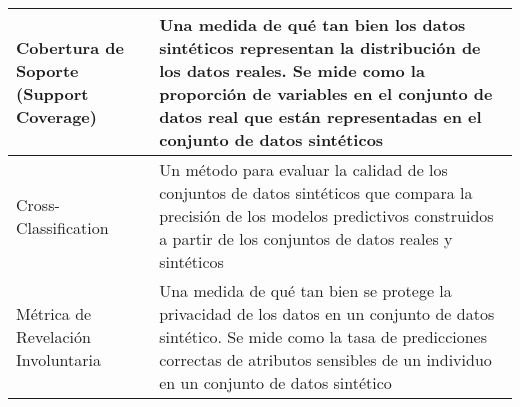 \begin{longtable}{|m{7em}|m{30em}|}
    \hline
    Cobertura de Soporte (Support Coverage) & Una medida de qué tan bien los datos sintéticos representan la distribución de los datos reales. Se mide como la proporción de variables en el conjunto de datos real que están representadas en el conjunto de datos sintéticos \\
    \hline
    Cross-Classification & Un método para evaluar la calidad de los conjuntos de datos sintéticos que compara la precisión de los modelos predictivos construidos a partir de los conjuntos de datos reales y sintéticos \\
    \hline
    Métrica de Revelación Involuntaria & Una medida de qué tan bien se protege la privacidad de los datos en un conjunto de datos sintético. Se mide como la tasa de predicciones correctas de atributos sensibles de un individuo en un conjunto de datos sintético \\
    \hline
    
    
\end{longtable}
